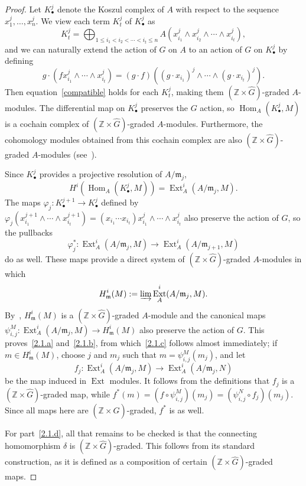 \documentclass[ALCO,ThmDefs,Unicode]{cedram}
\DeclareMathOperator{\Hom}{Hom}
\DeclareMathOperator{\Ext}{Ext}
\newcommand{\ZZ}{{\mathbb Z}}
\newcommand{\mideal}{\ensuremath{\mathfrak{m}}}
\begin{document}
\begin{proof}
Let $K_\bullet^j$ denote the Koszul complex of $A$ with respect to the sequence $x_1^j, \ldots, x_n^j$. We view each term $K_t^j$ of $K_\bullet^j$ as
\[
K_t^j = \bigoplus_{1\le i_1<i_2<\cdots<i_t\le n}A(x_{i_1}^{j}\wedge x_{i_2}^{j}\wedge\cdots\wedge x_{i_t}^{j}),
\]
and we can naturally extend the action of $G$ on $A$ to an action of $G$ on $K_\bullet^j$ by defining
\[
g\cdot \left(f x_{i_1}^{j}\wedge\cdots\wedge x_{i_t}^{j}\right) = (g\cdot f)((g\cdot x_{i_1})^j\wedge\cdots\wedge (g\cdot x_{i_t})^j).
\]
Then equation~\eqref{compatible} holds for each $K_t^j$, making them $(\ZZ\times \hat{G})$-graded $A$-modules. The differential map on $K_\bullet^j$ preserves the $G$ action, so $\Hom_A(K_\bullet^j, M)$ is a cochain complex of $(\ZZ\times \hat{G})$-graded $A$-modules. Furthermore, the cohomology modules obtained from this cochain complex are also $(\ZZ\times \hat{G})$-graded $A$-modules (see~\cite[Proposition~II.11.3.3]{Bourbaki}).

Since $K_\bullet^j$ provides a projective resolution of $A/\mideal_j$,
\[
H^i(\Hom_A(K_\bullet^j, M))=\Ext_A^i(A/\mideal_j, M).
\]
The maps $\varphi_j :K_\bullet^{j+1}\to K_\bullet^j$ defined by $\varphi_j(x_{i_1}^{j+1}\wedge \cdots\wedge x_{i_t}^{j+1})=(x_{i_1}\!\cdots x_{i_t})x_{i_1}^{j}\wedge \cdots\wedge x_{i_t}^{j}$ also preserve the action of $G$, so the pullbacks
\[
\varphi_j^*:\Ext_A^i(A/\mideal_j, M)\to\Ext_A^i(A/\mideal_{j+1}, M)
\]
do as well. These maps provide a direct system of $(\ZZ\times \hat{G})$-graded $A$-modules in which
\[
H_\mideal^i(M):=\varinjlim\Ext_A^i(A/\mideal_j, M).
\]
By~\cite[Remark~II.11.3.3]{Bourbaki}, $H_\mideal^i(M)$ is a $(\ZZ\times \hat{G})$-graded $A$-module and the canonical maps $\psi_{i, j}^M:\Ext_A^i(A/\mideal_j, M)\to H_\mideal^i(M)$ also preserve the action of $G$. This proves~\eqref{2.1.a} and~\eqref{2.1.b}, from which~\eqref{2.1.c} follows almost immediately; if $m\in H_\mideal^i(M)$, choose $j$ and $m_j$ such that $m=\psi_{i, j}^M(m_j)$, and let
\[
f_j: \Ext_A^i(A/\mideal_j, M)\to \Ext_A^i(A/\mideal_j, N)
\]
be the map induced in $\Ext$ modules. It follows from the definitions that $f_j$ is a $(\ZZ\times\hat{G})$-graded map, while $f^*(m)=(f\circ \psi_{i, j}^M)(m_j)=(\psi_{i, j}^N\circ f_j)(m_j)$. Since all maps here are $(\ZZ\times\hat{G})$-graded, $f^*$ is as well.

For part~\eqref{2.1.d}, all that remains to be checked is that the connecting homomorphism $\delta$ is $(\ZZ\times\hat{G})$-graded. This follows from its standard construction, as it is defined as a composition of certain $(\ZZ\times\hat{G})$-graded maps.
\end{proof}
\end{document}
